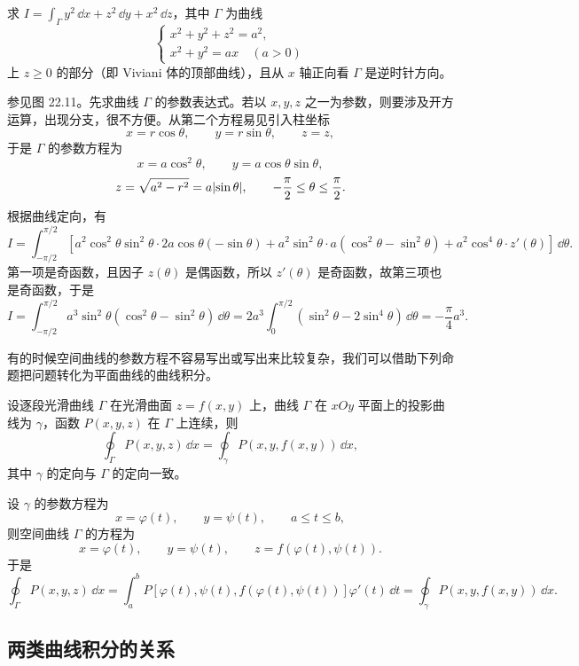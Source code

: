 \begin{xexample}[24.2.2]
求 $I=\displaystyle\int_\Gamma y^2\,\dd x+z^2\,\dd y+x^2\,\dd z$，其中 $\Gamma$ 为曲线
\[
  \begin{cases}
    x^2+y^2+z^2=a^2,\\
    x^2+y^2=ax\quad(a>0)
  \end{cases}
\]
上 $z\ge0$ 的部分（即 Viviani 体的顶部曲线），且从 $x$ 轴正向看 $\Gamma$ 是逆时针方向。
\end{xexample}
\begin{xsolution}
参见图 22.11。先求曲线 $\Gamma$ 的参数表达式。若以 $x,y,z$ 之一为参数，则要涉及开方运算，出现分支，很不方便。从第二个方程易见引入柱坐标
\[
  x=r\cos\theta,\qquad y=r\sin\theta,\qquad z=z,
\]
于是 $\Gamma$ 的参数方程为
\[
  x=a\cos^2\theta,\qquad y=a\cos\theta\sin\theta,
\]
\[
  z=\sqrt{a^2-r^2}=a\lvert\sin\theta\rvert,\qquad -\frac\pi2\le\theta\le\frac\pi2.
\]
根据曲线定向，有
\[
  I=\int_{-\pi/2}^{\pi/2}\left[a^2\cos^2\theta\sin^2\theta\cdot2a\cos\theta(-\sin\theta)+a^2\sin^2\theta\cdot a(\cos^2\theta-\sin^2\theta)+a^2\cos^4\theta\cdot z'(\theta)\right]\,\dd\theta.
\]
第一项是奇函数，且因子 $z(\theta)$ 是偶函数，所以 $z'(\theta)$ 是奇函数，故第三项也是奇函数，于是
\[
  I=\int_{-\pi/2}^{\pi/2}a^3\sin^2\theta(\cos^2\theta-\sin^2\theta)\,\dd\theta
  =2a^3\int_0^{\pi/2}(\sin^2\theta-2\sin^4\theta)\,\dd\theta=-\frac\pi4a^3.
\]
\end{xsolution}

有的时候空间曲线的参数方程不容易写出或写出来比较复杂，我们可以借助下列命题把问题转化为平面曲线的曲线积分。

\begin{xproposition}[24.2.1]
设逐段光滑曲线 $\Gamma$ 在光滑曲面 $z=f(x,y)$ 上，曲线 $\Gamma$ 在 $xOy$ 平面上的投影曲线为 $\gamma$，函数 $P(x,y,z)$ 在 $\Gamma$ 上连续，则
\[
  \oint_\Gamma P(x,y,z)\,\dd x=\oint_\gamma P(x,y,f(x,y))\,\dd x,
\]
其中 $\gamma$ 的定向与 $\Gamma$ 的定向一致。
\end{xproposition}
\begin{xproof}
设 $\gamma$ 的参数方程为
\[
  x=\varphi(t),\qquad y=\psi(t),\qquad a\le t\le b,
\]
则空间曲线 $\Gamma$ 的方程为
\[
  x=\varphi(t),\qquad y=\psi(t),\qquad z=f(\varphi(t),\psi(t)).
\]
于是
\[
  \oint_\Gamma P(x,y,z)\,\dd x=\int_a^bP[\varphi(t),\psi(t),f(\varphi(t),\psi(t))]\varphi'(t)\,\dd t
  =\oint_\gamma P(x,y,f(x,y))\,\dd x.
\]
\end{xproof}

\subsection{两类曲线积分的关系}

